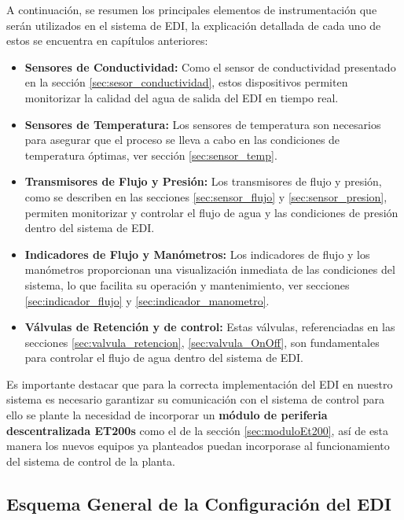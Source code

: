 A continuación, se resumen los principales elementos de instrumentación que serán utilizados en el sistema de EDI, la explicación detallada de cada uno de estos se encuentra en capítulos anteriores:
\begin{itemize}
      \item \textbf{Sensores de Conductividad:} Como el sensor de conductividad presentado en la sección \ref{sec:sesor_conductividad}, estos dispositivos permiten monitorizar la calidad del agua de salida del EDI en tiempo real.

      \item \textbf{Sensores de Temperatura:} Los sensores de temperatura son necesarios para asegurar que el proceso se lleva a cabo en las condiciones de temperatura óptimas, ver sección \ref{sec:sensor_temp}.

      \item \textbf{Transmisores de Flujo y Presión:} Los transmisores de flujo y presión, como se describen en las secciones \ref{sec:sensor_flujo} y \ref{sec:sensor_presion}, permiten monitorizar y controlar el flujo de agua y las condiciones de presión dentro del sistema de EDI.

      \item \textbf{Indicadores de Flujo y Manómetros:} Los indicadores de flujo y los manómetros proporcionan una visualización inmediata de las condiciones del sistema, lo que facilita su operación y mantenimiento, ver secciones \ref{sec:indicador_flujo} y \ref{sec:indicador_manometro}.

      \item \textbf{Válvulas de Retención y de control:} Estas válvulas, referenciadas en las secciones  \ref{sec:valvula_retencion}, \ref{sec:valvula_OnOff}, son fundamentales para controlar el flujo de agua dentro del sistema de EDI.
\end{itemize}
Es importante destacar que para la correcta implementación del EDI en nuestro sistema es necesario garantizar su comunicación con el sistema de control
para ello se plante la necesidad de incorporar un \textbf{módulo  de periferia descentralizada ET200s} como el de la sección \ref{sec:moduloEt200}, así de esta manera
los nuevos equipos ya planteados puedan incorporase al funcionamiento del sistema de control de la planta.

\subsection{Esquema General de la Configuración del EDI}

